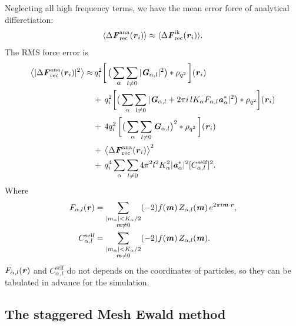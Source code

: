 \documentclass[aps,pre,preprint]{revtex4}
\renewcommand{\v}[1]{\textbf{\textit{#1}}}
\begin{document}
Neglecting all high frequency terms, we have the mean error force of
analytical differetiation:
\begin{align}\label{eqn:ana.meanf}
  \langle \Delta\v F_{\textrm{rec}}^{\textrm{ana}}(\v r_i)\rangle
  \approx
  \langle \Delta\v F_{\textrm{rec}}^{\textrm{ik}}(\v r_i)\rangle.
\end{align}
The RMS force error is 
\begin{align}\nonumber
  \big\langle
  \vert \Delta\v F_{\textrm{rec}}^{\textrm{ana}}(\v r_i)\vert^2
  \big\rangle
  \approx&\,
  q_i^2
  \bigg[\,
  \big(
  \sum_{\alpha} \sum_{l\neq 0}
  \vert \v G_{\alpha,l}\vert^2
  \big)
  \ast \rho_{q^2}
  \,\bigg] (\v r_i) \\\nonumber
  & +\,
  q_i^2
  \bigg[
  \big(
  \sum_{\alpha}\sum_{l\neq 0}
  \vert
  \v G_{\alpha,l} + 2\pi i\,l K_\alpha F_{\alpha,l} \v a_\alpha^\ast\vert^2
  \big)
  \ast \rho_{q^2}
  \bigg]
  (\v r_i) \\ \nonumber
  & +\,
  4q_i^2\,
  \bigg[
  \big(
  \sum_{\alpha} \sum_{l\neq 0}  
  \v G_{\alpha,l}
  \big)^2
  \ast \rho_{q^2}\,
  \bigg] (\v r_i) \\\nonumber
  & +\,
  \big\langle \Delta\v F_{\textrm{rec}}^{\textrm{ana}}(\v r_i)\big\rangle ^2\\\label{eqn:ana.error}
  &+\,
  q_i^4 \sum_{\alpha}\sum_{l\neq 0}
  4\pi^2l^2K_\alpha^2\vert\v a_{\alpha}^\ast\vert^2[C_{\alpha,l}^{\textrm{self}}]^2 .
\end{align}
Where
\begin{align}
  F_{\alpha,l} (\v r)
  &=
  \sum_{
    \begin{subarray}{c}
      \vert m_{\alpha}\vert < K_\alpha/2\\
      \v m\neq 0
    \end{subarray}}
  (-2)f(\v m)\,
  Z_{\alpha,l}(\v m)\,
  e^{2\pi i\v m\cdot \v r},\\
  C_{\alpha,l}^{\textrm{self}}
  &= 
  \sum_{
    \begin{subarray}{c}
      \vert m_{\alpha}\vert < K_\alpha/2\\
      \v m\neq 0
    \end{subarray}}
  (-2)f(\v m)\,
  Z_{\alpha,l}(\v m).
\end{align}
$F_{\alpha,l} (\v r)$ and $C_{\alpha,l}^{\textrm{self}}$ 
do not depends on the coordinates of particles,
so they can be tabulated in advance for the simulation.

\subsection{The staggered Mesh Ewald method}
\end{document}
